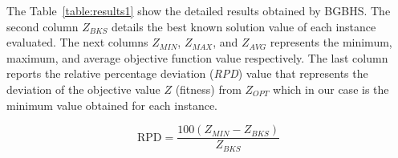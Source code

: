 The Table~\ref{table:results1} show the detailed results obtained by BGBHS. The second column $Z_{BKS}$ details the best known solution value of each instance evaluated. The next columns $Z_{MIN}$, $Z_{MAX}$, and $Z_{AVG}$ represents the minimum, maximum, and average objective function value respectively. The last column reports the relative percentage deviation (\textit{RPD}) value that represents the deviation of the objective value $Z$ (fitness) from $Z_{OPT}$ which in our case is the minimum value obtained for each instance. 

\begin{equation}\label{ec:RPD} 
\mbox{RPD} = \frac{100(Z_{MIN} - Z_{BKS})}{Z_{BKS}} 
\end{equation}
\begin{table}[H]
	\scriptsize
	\begin{center}
\end{center}
\end{table}
